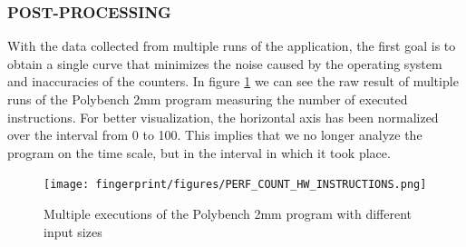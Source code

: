 
\subsubsection{POST-PROCESSING}
\label{sec:posprocessing}

With the data collected from multiple runs of the application, the first goal is to obtain a single curve that minimizes the noise caused by the operating system and inaccuracies of the counters. 
In figure \ref{fig:multiple_exec} we can see the raw result of multiple runs of the Polybench 2mm program measuring the number of executed instructions. 
For better visualization, the horizontal axis has been normalized over the interval from 0 to 100. 
This implies that we no longer analyze the program on the time scale, but in the interval in which it took place.

\begin{figure}[H]
    \centering
    \texttt{[image: fingerprint/figures/PERF\_COUNT\_HW\_INSTRUCTIONS.png]}
    \caption{Multiple executions of the Polybench 2mm program with different input sizes}
    \label{fig:multiple_exec}
\end{figure}

